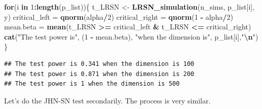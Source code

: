 \documentclass[
]{article}
\newenvironment{Shaded}{\begin{snugshade}}{\end{snugshade}}
\newcommand{\ControlFlowTok}[1]{\textcolor[rgb]{0.13,0.29,0.53}{\textbf{#1}}}
\newcommand{\DecValTok}[1]{\textcolor[rgb]{0.00,0.00,0.81}{#1}}
\newcommand{\FunctionTok}[1]{\textcolor[rgb]{0.13,0.29,0.53}{\textbf{#1}}}
\newcommand{\NormalTok}[1]{#1}
\newcommand{\OtherTok}[1]{\textcolor[rgb]{0.56,0.35,0.01}{#1}}
\newcommand{\SpecialCharTok}[1]{\textcolor[rgb]{0.81,0.36,0.00}{\textbf{#1}}}
\newcommand{\StringTok}[1]{\textcolor[rgb]{0.31,0.60,0.02}{#1}}
\begin{document}
\begin{Shaded}
\begin{Highlighting}[]
\ControlFlowTok{for}\NormalTok{(i }\ControlFlowTok{in} \DecValTok{1}\SpecialCharTok{:}\FunctionTok{length}\NormalTok{(p\_list))\{}
\NormalTok{  t\_LRSN }\OtherTok{\textless{}{-}} \FunctionTok{LRSN\_simulation}\NormalTok{(n\_sims, p\_list[i], y)}
\NormalTok{  critical\_left }\OtherTok{=} \FunctionTok{qnorm}\NormalTok{(alpha}\SpecialCharTok{/}\DecValTok{2}\NormalTok{)}
\NormalTok{  critical\_right }\OtherTok{=} \FunctionTok{qnorm}\NormalTok{(}\DecValTok{1} \SpecialCharTok{{-}}\NormalTok{ alpha}\SpecialCharTok{/}\DecValTok{2}\NormalTok{)}
\NormalTok{  mean.beta }\OtherTok{=} \FunctionTok{mean}\NormalTok{(t\_LRSN }\SpecialCharTok{\textgreater{}=}\NormalTok{ critical\_left }\SpecialCharTok{\&}\NormalTok{ t\_LRSN }\SpecialCharTok{\textless{}=}\NormalTok{ critical\_right)}
  \FunctionTok{cat}\NormalTok{(}\StringTok{"The test power is"}\NormalTok{, (}\DecValTok{1} \SpecialCharTok{{-}}\NormalTok{ mean.beta), }\StringTok{"when the dimension is"}\NormalTok{, p\_list[i],}\StringTok{"}\SpecialCharTok{\textbackslash{}n}\StringTok{"}\NormalTok{)}
\NormalTok{\}}
\end{Highlighting}
\end{Shaded}

\begin{verbatim}
## The test power is 0.341 when the dimension is 100 
## The test power is 0.871 when the dimension is 200 
## The test power is 1 when the dimension is 500
\end{verbatim}

Let's do the JHN-SN test secondarily. The process is very similar.
\end{document}
